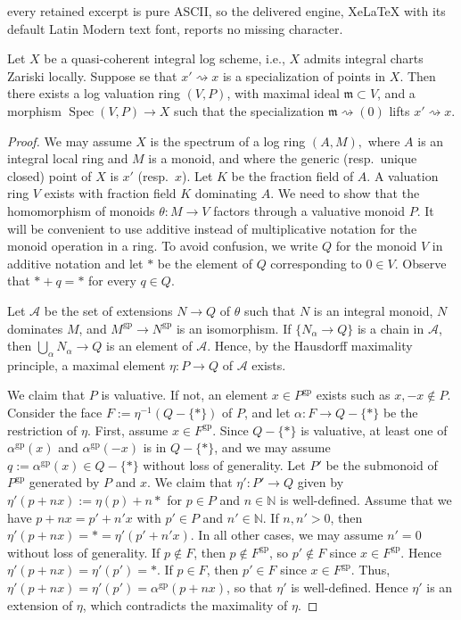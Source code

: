 \documentclass[10pt,a4paper]{amsart}
\DeclareMathOperator{\Spec}{Spec}
\newcommand{\N}{\mathbb{N}}
\newcommand{\cA}{\mathcal{A}}
\newcommand{\gp}{\mathrm{gp}}
\begin{document}
every retained excerpt is pure ASCII, so the delivered engine, XeLaTeX with its default Latin Modern text font, reports no missing character.
\begin{theorem}\label{thm:logvaluationringsliftspecializations}
Let $X$ be a quasi-coherent integral log scheme, 
i.e., $X$ admits integral charts Zariski locally.
Suppose se that $x' \rightsquigarrow x$ is a specialization
of points in $X$. 
Then there exists a log valuation ring $(V,P)$, 
with maximal ideal $\mathfrak{m} \subset V$, 
and a morphism $\Spec{(V,P)} \to X$ such that the specialization
$\mathfrak{m} \rightsquigarrow (0)$ lifts $x' \rightsquigarrow x$.
\end{theorem}

\begin{proof}
We may assume $X$ is the spectrum of a log ring $(A,M),$ 
where $A$ is an integral local ring and $M$ is a monoid, 
and where the generic (resp.\ unique closed) point of $X$ is $x'$ (resp.\ $x$).
Let $K$ be the fraction field of $A$.
A valuation ring $V$ exists with fraction field $K$ dominating $A$.
We need to show that the homomorphism of monoids $\theta\colon M\to V$ 
factors through a valuative monoid $P$.
It will be convenient to use additive instead of multiplicative notation for the 
monoid operation in a ring.
To avoid confusion,
we write $Q$ for the monoid $V$ in additive notation
and let $*$ be the element of $Q$ corresponding to $0\in V$.
Observe that $*+q=*$ for every $q\in Q$.

Let $\cA$ be the set of extensions $N\to Q$ of $\theta$ such that $N$ is an integral monoid,
$N$ dominates $M$,
and $M^\gp\to N^\gp$ is an isomorphism.
If $\{N_\alpha\to Q\}$ is a chain in $\cA$,
then $\bigcup_\alpha N_\alpha \to Q$ is an element of $\cA$.
Hence, 
by the Hausdorff maximality principle, 
a maximal element $\eta\colon P\to Q$ of $\cA$ exists.

We claim that $P$ is valuative.
If not, an element $x\in P^\gp$ exists such as $x,-x\notin P$.
Consider the face $F:=\eta^{-1}(Q-\{*\})$ of $P$,
and let $\alpha\colon F\to Q-\{*\}$ be the restriction of $\eta$.
First, assume $x\in F^\gp$.
Since $Q-\{*\}$ is valuative,
at least one of $\alpha^\gp(x)$ and $\alpha^\gp(-x)$ is in $Q-\{*\}$,
and we may assume $q:=\alpha^\gp(x)\in Q-\{*\}$ without loss of generality.
Let $P'$ be the submonoid of $P^{\gp}$ generated by $P$ and $x$.
We claim that $\eta'\colon P'\to Q$ given by $\eta'(p+nx):=\eta(p)+n*$ for $p\in P$ and $n\in \N$ is well-defined.
Assume that we have $p+nx=p'+n'x$ with $p'\in P$ and $n'\in \N$.
If $n,n'>0$,
then $\eta'(p+nx)=*=\eta'(p'+n'x)$.
In all other cases, we may assume $n'=0$ without loss of generality.
If $p\notin F$, then $p\notin F^\gp$,
so $p'\notin F$ since $x\in F^\gp$.
Hence $\eta'(p+nx)=\eta'(p')=*$.
If $p\in F$,
then $p'\in F$ since $x\in F^\gp$.
Thus, 
$\eta'(p+nx)=\eta'(p')=\alpha^\gp(p+nx)$, 
so that $\eta'$ is well-defined.
Hence $\eta'$ is an extension of $\eta$,
which contradicts the maximality of $\eta$.


\end{proof}
\end{document}
